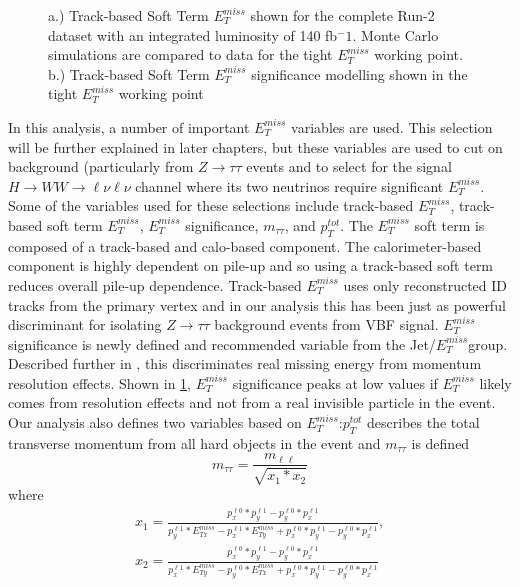 \begin{figure}[!h]
\begin{minipage}[b]{0.45\textwidth}
  \end{minipage}
    \caption{ a.) Track-based Soft Term $E_T^{miss}$ shown for the complete Run-2 dataset with an integrated luminosity of 140 fb$^-1$. Monte Carlo simulations are compared to data for the tight $E_T^{miss}$ working point. b.) Track-based Soft Term $E_T^{miss}$ significance modelling shown in the tight $E_T^{miss}$ working point  \cite{JETEtmiss}}
    \label{fig:METPerf}
\end{figure}

In this analysis, a number of important $E_T^{miss}$ variables are used. This selection will be further explained in later chapters, but these variables are used to cut on background (particularly from $Z\rightarrow \tau\tau$ events and to select for the signal $H\rightarrow WW\rightarrow \ell\nu\ell\nu$ channel where its two neutrinos require significant $E_T^{miss}$. Some of the variables used for these selections include track-based $E_T^{miss}$, track-based soft term $E_T^{miss}$, $E_T^{miss}$ significance, $m_{\tau\tau}$, and $p_T^{tot}$. The $E_T^{miss}$ soft term is composed of a track-based and calo-based component. The calorimeter-based component is highly dependent on pile-up and so using a track-based soft term reduces overall pile-up dependence. Track-based $E_T^{miss}$ uses only reconstructed ID tracks from the primary vertex and in our analysis this has been just as powerful discriminant for isolating $Z\rightarrow \tau\tau$ background events from VBF signal. $E_T^{miss}$ significance is newly defined and recommended variable from the Jet/$E_T^{miss}$group. Described further in \cite{METSig}, this discriminates real missing energy from momentum resolution effects. Shown in \ref{fig:METPerf},  $E_T^{miss}$ significance peaks at low values if $E_T^{miss}$ likely comes from resolution effects and not from a real invisible particle in the event. Our analysis also defines two variables based on $E_T^{miss}$:$p_T^{tot}$ describes the total transverse momentum from all hard objects in the event and $m_{\tau\tau}$ is defined
\begin{equation}
m_{\tau\tau} = \frac{m_{\ell\ell}}{\sqrt{x_1*x_2}}
\end{equation}
where 
\begin{equation}
\begin{split}
x_1 = \frac{p^{\ell0}_x*p^{\ell1}_y-p^{\ell0}_y*p^{\ell1}_x}{p^{\ell1}_y*E_{Tx}^{miss}-p^{\ell1}_x*E_{Ty}^{miss}+p^{\ell0}_x*p^{\ell1}_y-p^{\ell0}_y*p^{\ell1}_x}, \\
x_2 = \frac{p^{\ell0}_x*p^{\ell1}_y-p^{\ell0}_y*p^{\ell1}_x}{p^{\ell1}_x*E_{Ty}^{miss}-p^{\ell0}_y*E_{Tx}^{miss}+p^{\ell0}_x*p^{\ell1}_y-p^{\ell0}_y*p^{\ell1}_x}
\end{split}
\end{equation}

